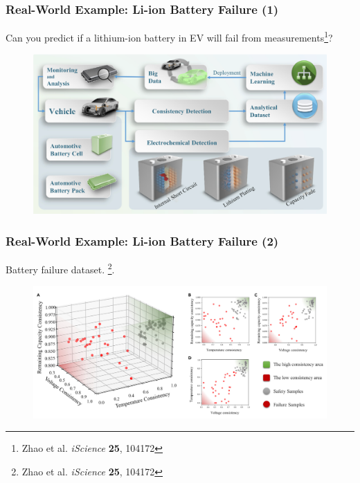 \documentclass[10pt,aspectratio=169]{beamer}
\begin{document}
      \begin{frame}
        \frametitle{Real-World Example: Li-ion Battery Failure (1)}

        Can you predict if a lithium-ion battery in EV will fail from measurements\let\thefootnote\relax\footnote{{\tiny Zhao et al. \textit{iScience} \textbf{25}, 104172}}?

        \begin{figure}[t]
          \includegraphics[width=0.9\linewidth]{images/battery_1.png}
        \end{figure}

      \end{frame}

      \begin{frame}
        \frametitle{Real-World Example: Li-ion Battery Failure (2)}
        Battery failure dataset. \let\thefootnote\relax\footnote{{\tiny Zhao et al. \textit{iScience} \textbf{25}, 104172}}.

        \begin{figure}[t]
          \includegraphics[width=1.0\linewidth]{images/battery_2.png}
        \end{figure}
      \end{frame}
\end{document}
